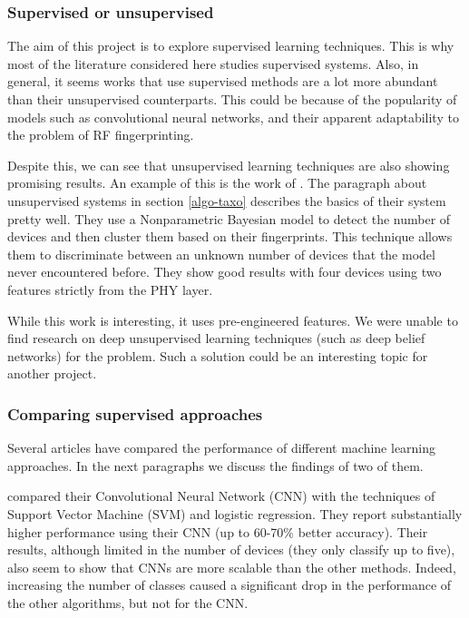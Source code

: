 \subsubsection{Supervised or unsupervised}

The aim of this project is to explore supervised learning techniques. This is why most of the literature considered here studies supervised systems. Also, in general, it seems works that use supervised methods are a lot more abundant than their unsupervised counterparts. This could be because of the popularity of models such as convolutional neural networks, and their apparent adaptability to the problem of RF fingerprinting.

Despite this, we can see that unsupervised learning techniques are also showing promising results. An example of this is the work of \textcite{nguyen_device_2011}. The paragraph about unsupervised systems in section \ref{algo-taxo} describes the basics of their system pretty well. They use a Nonparametric Bayesian model to detect the number of devices and then cluster them based on their fingerprints. This technique allows them to discriminate between an unknown number of devices that the model never encountered before. They show good results with four devices using two features strictly from the PHY layer.

While this work is interesting, it uses pre-engineered features. We were unable to find research on deep unsupervised learning techniques (such as deep belief networks) for the problem. Such a solution could be an interesting topic for another project.

\subsubsection{Comparing supervised approaches}

Several articles have compared the performance of different machine learning approaches. In the next paragraphs we discuss the findings of two of them.

\textcite{riyaz_deep_2018} compared their Convolutional Neural Network (CNN) with the techniques of Support Vector Machine (SVM) and logistic regression. They report substantially higher performance using their CNN (up to 60-70\% better accuracy). Their results, although limited in the number of devices (they only classify up to five), also seem to show that CNNs are more scalable than the other methods. Indeed, increasing the number of classes caused a significant drop in the performance of the other algorithms, but not for the CNN.

